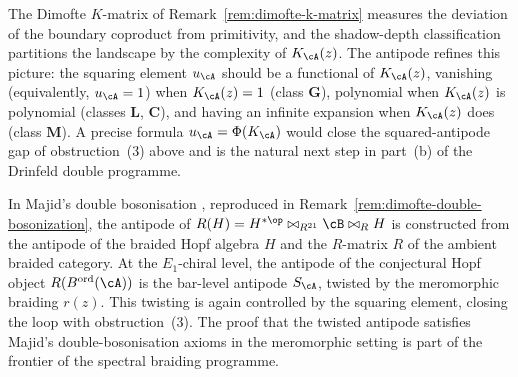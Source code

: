 \begin{remark}
\label{rem:antipode-dimofte-k-matrix}
The Dimofte $K$-matrix of Remark~\ref{rem:dimofte-k-matrix}
measures the deviation of the boundary coproduct from primitivity,
and the shadow-depth classification partitions the landscape by
the complexity of $K_\cA(z)$. The antipode refines this picture:
the squaring element $u_\cA$ should be a functional of $K_\cA(z)$,
vanishing (equivalently, $u_\cA = 1$) when $K_\cA(z) = 1$
(class $\mathbf{G}$), polynomial when $K_\cA(z)$ is polynomial
(classes $\mathbf{L}$, $\mathbf{C}$), and having an infinite
expansion when $K_\cA(z)$ does (class $\mathbf{M}$). A precise
formula $u_\cA = \Phi(K_\cA)$ would close the squared-antipode gap of
obstruction~(3) above and is the natural next step in part~(b) of
the Drinfeld double programme.
\end{remark}

\begin{remark}
\label{rem:antipode-majid}
In Majid's double bosonisation
\cite{Majid95}, reproduced in
Remark~\ref{rem:dimofte-double-bosonization}, the antipode of
$R(H) = H^{*\op} \bowtie_{R^{21}} \cB \bowtie_{R} H$ is
constructed from the antipode of the braided Hopf algebra $H$ and
the $R$-matrix $R$ of the ambient braided category. At the
$E_1$-chiral level, the antipode of the conjectural Hopf object
$R(B^{\mathrm{ord}}(\cA))$ is the bar-level antipode $S_\cA$,
twisted by the meromorphic braiding $r(z)$. This twisting is
again controlled by the squaring element,
closing the loop with obstruction~(3). The proof that the twisted
antipode satisfies Majid's double-bosonisation axioms in the
meromorphic setting is part of the frontier of the spectral
braiding programme.
\end{remark}

